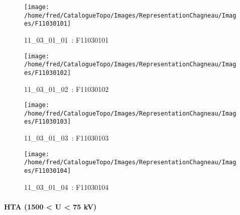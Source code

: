 \documentclass[12pt,titlepage,oneside]{book}
\begin{document}
\begin{figure}[h!]
  \hfill         %
  \begin{minipage}[t]{3cm}
    \begin{center}
      \texttt{[image: /home/fred/CatalogueTopo/Images/RepresentationChagneau/Images/F11030101]}
      \caption[~11\_03\_01\_01]{\small{11\_03\_01\_01~:} \tiny{F11030101}}\label{F11030101}
    \end{center}
  \end{minipage}
  \begin{minipage}[t]{3cm}
    \begin{center}
      \texttt{[image: /home/fred/CatalogueTopo/Images/RepresentationChagneau/Images/F11030102]}
      \caption[~11\_03\_01\_02]{\small{11\_03\_01\_02~:} \tiny{F11030102}}\label{F11030102}
    \end{center}
  \end{minipage}
  \begin{minipage}[t]{3cm}
    \begin{center}
      \texttt{[image: /home/fred/CatalogueTopo/Images/RepresentationChagneau/Images/F11030103]}
      \caption[~11\_03\_01\_03]{\small{11\_03\_01\_03~:} \tiny{F11030103}}\label{F11030103}
    \end{center}
  \end{minipage}
  \begin{minipage}[t]{3cm}
    \begin{center}
      \texttt{[image: /home/fred/CatalogueTopo/Images/RepresentationChagneau/Images/F11030104]}
      \caption[~11\_03\_01\_04]{\small{11\_03\_01\_04~:} \tiny{F11030104}}\label{F11030104}
    \end{center}
  \end{minipage}
\end{figure}


\paragraph{HTA (1500 < U < 75 kV)}
\noindent
\vspace{\baselineskip}
\end{document}
